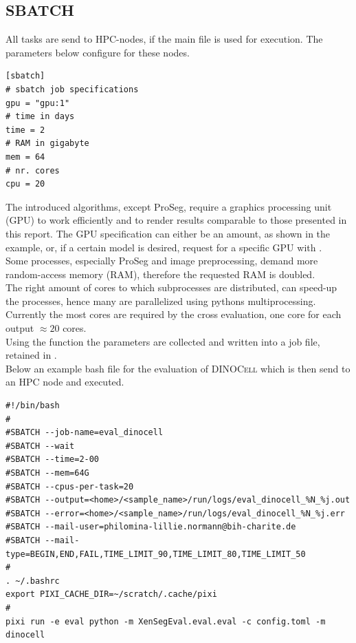\subsection*{SBATCH}
All tasks are send to HPC-nodes, if the main file is used for execution. The parameters below configure for these nodes.
\begin{lstlisting}[style=customIni]
[sbatch]
# sbatch job specifications
gpu = "gpu:1"
# time in days
time = 2
# RAM in gigabyte
mem = 64
# nr. cores
cpu = 20
\end{lstlisting}
The introduced algorithms, except ProSeg, require a graphics processing unit (GPU) to work efficiently and to render results comparable to those presented in this report. The GPU specification can either be an amount, as shown in the example, or, if a certain model is desired, request for a specific GPU with .\\
Some processes, especially ProSeg and image preprocessing, demand more random-access memory (RAM), therefore the requested RAM is doubled.\\ 
The right amount of cores to which subprocesses are distributed, can speed-up the processes, hence many are parallelized using pythons multiprocessing. Currently the most cores are required by the cross evaluation, one core for each output $\approx 20$ cores.\\
Using the function  the parameters are collected and written into a job file, retained in .\\
Below an example bash file for the evaluation of \textsc{DINOCell} which is then send to an HPC node and executed. 
\begin{lstlisting}[style=custombash]
#!/bin/bash
#
#SBATCH --job-name=eval_dinocell
#SBATCH --wait
#SBATCH --time=2-00
#SBATCH --mem=64G
#SBATCH --cpus-per-task=20
#SBATCH --output=<home>/<sample_name>/run/logs/eval_dinocell_%N_%j.out
#SBATCH --error=<home>/<sample_name>/run/logs/eval_dinocell_%N_%j.err
#SBATCH --mail-user=philomina-lillie.normann@bih-charite.de
#SBATCH --mail-type=BEGIN,END,FAIL,TIME_LIMIT_90,TIME_LIMIT_80,TIME_LIMIT_50
#
. ~/.bashrc
export PIXI_CACHE_DIR=~/scratch/.cache/pixi
#
pixi run -e eval python -m XenSegEval.eval.eval -c config.toml -m dinocell
\end{lstlisting}
